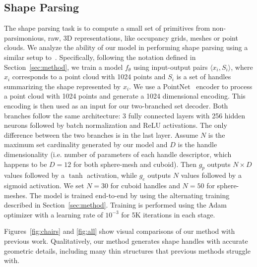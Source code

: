 \subsection{Shape Parsing}

The shape parsing task is to compute a small set of primitives from non-parsimonious,
raw, 3D representations, like occupancy grids, meshes or point clouds.
We analyze the ability of our model in performing shape parsing using a similar setup
to~\cite{Paschalidou2019, Tulsiani2017}.
Specifically, following the notation defined in Section~\ref{sec:method},
we train a model $f_\theta$ using input-output pairs $\langle x_i, S_i \rangle$, where
$x_i$ corresponds to a point cloud with 1024 points and $S_i$ is a set of handles
summarizing the shape represented by $x_i$.
We use a PointNet~\cite{pointnet} encoder to process
a point cloud with 1024 points and generate a 1024 dimensional encoding.
This encoding is then used as an input for our two-branched set decoder.
Both branches follow the same architecture: 3 fully connected layers with 256 hidden neurons
followed by batch normalization and ReLU activations.
The only difference between the two branches is in the last layer.
Assume $N$ is the maximum set cardinality generated by our model and $D$ is the handle
dimensionality (i.e. number of parameters of each handle descriptor, which happens to be $D=12$ for both sphere-mesh and cuboid). Then
$g_p$ outputs $N\times D$ values followed by a $\tanh$ activation, while $g_e$
outputs $N$ values followed by a sigmoid activation.
We set $N=30$ for cuboid handles and $N=50$ for sphere-meshes. %
The model is trained end-to-end by using the alternating training described in Section~\ref{sec:method}.
Training is performed using the Adam optimizer with a learning rate of $10^{-3}$ for 5K iterations
in each stage.

Figures~\ref{fig:chairs} and \ref{fig:all} show visual comparisons of our method with previous work. Qualitatively, our method generates shape handles with accurate geometric details, including many thin structures that previous methods struggle with. 


